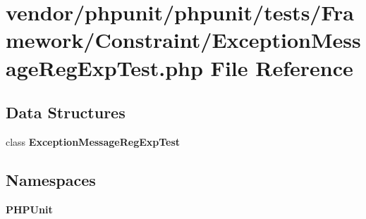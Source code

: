 \section{vendor/phpunit/phpunit/tests/\+Framework/\+Constraint/\+Exception\+Message\+Reg\+Exp\+Test.php File Reference}
\label{_exception_message_reg_exp_test_8php}
\subsection*{Data Structures}
\begin{DoxyCompactItemize}
\item 
class {\bf Exception\+Message\+Reg\+Exp\+Test}
\end{DoxyCompactItemize}
\subsection*{Namespaces}
\begin{DoxyCompactItemize}
\item 
 {\bf P\+H\+P\+Unit}
\end{DoxyCompactItemize}
